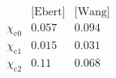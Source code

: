 $$
\begin{array}{c|cc}
 \text{} & \text{[Ebert]} & \text{[Wang]} \\
\hline
 \chi_{\text{c0}} & 0.057 & 0.094 \\
 \chi_{\text{c1}} & 0.015 & 0.031 \\
 \chi_{\text{c2}} & 0.11 & 0.068 \\
\end{array}$$
